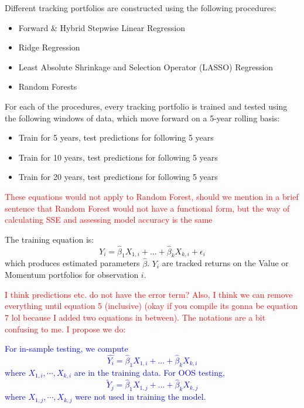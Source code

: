 \documentclass[AER]{AEA}
\begin{document}
\begin{spacing}{2}
Different tracking portfolios are constructed using the following procedures:
\begin{itemize}
    \item Forward \& Hybrid Stepwise Linear Regression
    \item Ridge Regression
    \item Least Absolute Shrinkage and Selection Operator (LASSO) Regression
    \item Random Forests
\end{itemize}

For each of the procedures, every tracking portfolio is trained and tested using the following windows of data, which move forward on a 5-year rolling basis:
\begin{itemize}
    \item Train for 5 years, test predictions for following 5 years
    \item Train for 10 years, test predictions for following 5 years
    \item Train for 20 years, test predictions for following 5 years
\end{itemize}

\textcolor{red}{These equations would not apply to Random Forest, should we mention in a brief sentence that Random Forest would not have a functional form, but the way of calculating SSE and assessing model accuracy is the same}

The training equation is:
\begin{equation} Y_i=\hat{\beta}_1X_{1,i}+{...}+\hat{\beta}_{k}X_{k,i}+\epsilon_i\label{eq:3}
\end{equation}
which produces estimated parameters \(\hat{\beta}\). $Y_i$ are tracked returns on the Value or Momentum portfolios for observation $i$.

\textcolor{red}{I think predictions etc. do not have the error term? Also, I think we can remove everything until equation 5 (inclusive) (okay if you compile its gonna be equation 7 lol because I added two equations in between). The notations are a bit confusing to me. I propose we do:}

\textcolor{blue}{For in-sample testing, we compute 
\begin{equation} \hat{Y_i}=\hat{\beta}_1X_{1,i}+{...}+\hat{\beta}_{k}X_{k,i}\label{eq:4}
\end{equation}
where $X_{1,i},\cdots,X_{k,i}$ are in the training data.
For OOS testing, \begin{equation} \tilde{Y}_j=\hat{\beta}_1X_{1,j}+{...}+\hat{\beta}_{k}X_{k,j}\label{eq:5}
\end{equation} where $X_{1,j},\cdots,X_{k,j}$ were not used in training the model.}


\end{spacing}
\end{document}
